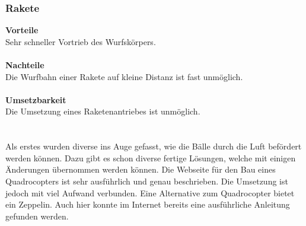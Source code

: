 \subsubsection{Rakete}
\textbf{Vorteile}\\
Sehr schneller Vortrieb des Wurfskörpers.\\
\\
\textbf{Nachteile}\\
Die Wurfbahn einer Rakete auf kleine Distanz ist fast unmöglich. \\
\\
\textbf{Umsetzbarkeit}\\
Die Umsetzung eines Raketenantriebes ist unmöglich.\\
\\
\\
Als erstes wurden diverse ins Auge gefasst, wie die Bälle durch die Luft befördert werden können. Dazu gibt es schon diverse fertige Lösungen, welche mit einigen Änderungen übernommen werden können. Die Webseite für den Bau eines Quadrocopters ist sehr ausführlich und genau beschrieben. Die Umsetzung ist jedoch mit viel Aufwand verbunden. Eine Alternative zum Quadrocopter bietet ein Zeppelin. Auch hier konnte im Internet bereits eine ausführliche Anleitung gefunden werden.
